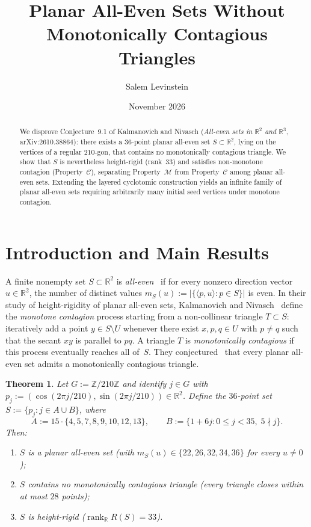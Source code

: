 \documentclass[11pt]{article}
\title{Planar All-Even Sets Without Monotonically Contagious Triangles}
\author{Salem Levinstein}
\date{November 2026}
\newtheorem{theorem}{Theorem}
\begin{document}
\maketitle

\begin{abstract}
We disprove Conjecture~9.1 of Kalmanovich and Nivasch (\emph{All-even sets in $\mathbb{R}^2$ and $\mathbb{R}^3$}, arXiv:2610.38864): there exists a $36$-point planar all-even set $S \subset \mathbb{R}^2$, lying on the vertices of a regular $210$-gon, that contains no monotonically contagious triangle. We show that $S$ is nevertheless height-rigid (rank~$33$) and satisfies non-monotone contagion (Property~$\mathcal{C}$), separating Property~$\mathcal{M}$ from Property~$\mathcal{C}$ among planar all-even sets. Extending the layered cyclotomic construction yields an infinite family of planar all-even sets requiring arbitrarily many initial seed vertices under monotone contagion.
\end{abstract}

\section{Introduction and Main Results}

A finite nonempty set $S \subset \mathbb{R}^2$ is \emph{all-even}~\cite{KN2026} if for every nonzero direction vector $u \in \mathbb{R}^2$, the number of distinct values $m_S(u) := |\{\langle p, u \rangle : p \in S\}|$ is even. In their study of height-rigidity of planar all-even sets, Kalmanovich and Nivasch~\cite[\S5]{KN2026} define the \emph{monotone contagion} process starting from a non-collinear triangle $T \subset S$: iteratively add a point $y \in S \setminus U$ whenever there exist $x, p, q \in U$ with $p \neq q$ such that the secant $xy$ is parallel to $pq$. A triangle $T$ is \emph{monotonically contagious} if this process eventually reaches all of~$S$. They conjectured~\cite[Conjecture~9.1]{KN2026} that every planar all-even set admits a monotonically contagious triangle.

\begin{theorem}\label{thm:36}
Let $G := \mathbb{Z}/210\mathbb{Z}$ and identify $j \in G$ with $p_j := (\cos(2\pi j/210), \sin(2\pi j/210)) \in \mathbb{R}^2$. Define the $36$-point set $S := \{p_j : j \in A \cup B\}$, where
\[
A := 15 \cdot \{4, 5, 7, 8, 9, 10, 12, 13\}, \qquad
B := \{1 + 6j : 0 \le j < 35,\; 5 \nmid j\}.
\]
Then:
\begin{enumerate}
\item $S$ is a planar all-even set (with $m_S(u) \in \{22, 26, 32, 34, 36\}$ for every $u \neq 0$);
\item $S$ contains no monotonically contagious triangle (every triangle closes within at most $28$ points);
\item $S$ is height-rigid ($\operatorname{rank}_{\mathbb{R}} R(S) = 33$).
\end{enumerate}
\end{theorem}
\end{document}

